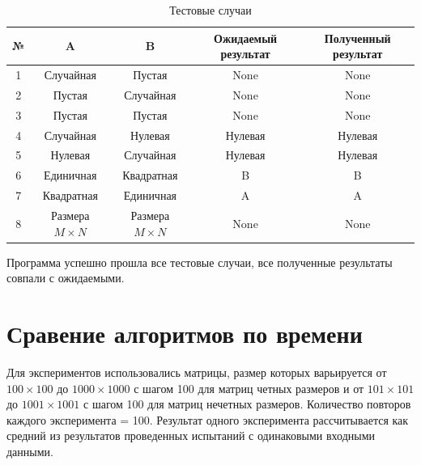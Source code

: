 \documentclass[a4paper,12pt]{report}
\begin{document}
\begin{table}[h!]
\begin{center}
\begin{tabular}{| c | c | c | c | c |}
\hline
№ & A & B & Ожидаемый результат & Полученный результат \\
\hline
1 & Случайная & Пустая & None & None\\
\hline
2 & Пустая & Случайная & None & None\\
\hline
3 & Пустая & Пустая & None & None\\
\hline
4 & Случайная & Нулевая & Нулевая & Нулевая\\
\hline
5 & Нулевая & Случайная & Нулевая  & Нулевая \\
\hline
6 & Единичная & Квадратная & B & B\\
\hline
7 & Квадратная & Единичная & A & A\\
\hline
8 & Размера $M \times N$ & Размера $M \times N$ & None & None\\
\hline
\end{tabular}
\caption{Тестовые случаи}
\end{center}
\end{table}

Программа успешно прошла все тестовые случаи, все полученные результаты совпали с ожидаемыми.

\section{Сравение алгоритмов по времени}
\hspace{0.6cm}Для экспериментов использовались матрицы, размер которых варьируется от $100 \times 100$ до $1000 \times 1000$ с шагом 100 для матриц четных размеров и от $101 \times 101$ до $1001 \times 1001$ с шагом 100 для матриц нечетных размеров. 
    Количество повторов каждого эксперимента = 100. Результат одного эксперимента рассчитывается как средний из результатов проведенных испытаний с одинаковыми входными данными.
    

\end{document}
